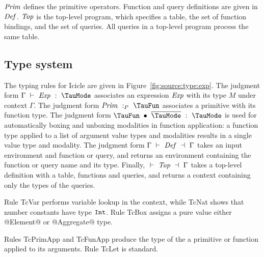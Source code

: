 $\mathit{Prim}$ defines the primitive operators.
Function and query definitions are given in $\mathit{Def}$. $\mathit{Top}$ is the top-level program, which specifies a table, the set of function bindings, and the set of queries. All queries in a top-level program process the same table.


\subsection{Type system}
The typing rules for Icicle are given in Figure~\ref{fig:source:type:exp}.
The judgment form $\Typecheck{\Gamma}{\mi{Exp}}{\TauMode}$ associates an expression $\mathit{Exp}$ with its type $M$ under context $\Gamma$.
The judgment form $\TypecheckP{\mi{Prim}}{\TauFun}$ associates a primitive with its function type.
The judgment form $\TypecheckApp{\TauFun}{\ov{\TauMode}}{\TauMode}$ is used for automatically boxing and unboxing modalities in function application: a function type applied to a list of argument value types and modalities results in a single value type and modality.
The judgment form $\TypecheckS{\Gamma}{\mi{Def}}{\Gamma}$ takes an input environment and function or query, and returns an environment containing the function or query name and its type.
Finally, $\TypecheckS{}{\mi{Top}}{\Gamma}$ takes a top-level definition with a table, functions and queries, and returns a context containing only the types of the queries.

Rule TcVar performs variable lookup in the context, while TcNat shows that number constants have type $\mathtt{Int}$. Rule TcBox assigns a pure value either @Element@ or @Aggregate@ type. 


Rules TcPrimApp and TcFunApp produce the type of the a primitive or function applied to its arguments. Rule TcLet is standard.


